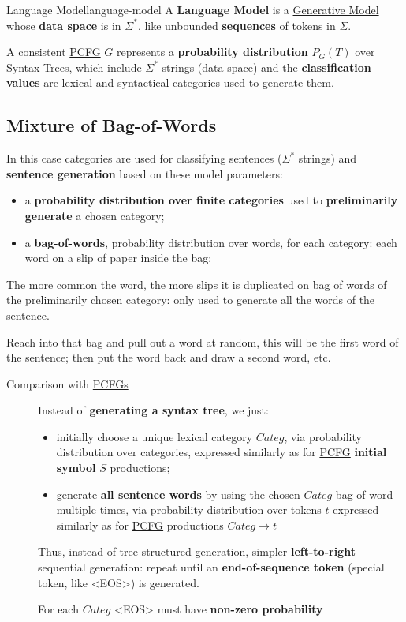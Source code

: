 \begin{definition}{Language Model}{language-model}
    A \textbf{Language Model} is a \hyperref[def:generative-model]{Generative Model} whose \textbf{data space} is in $\Sigma^*$, like unbounded \textbf{sequences} of tokens in $\Sigma$.
    \begin{example}{}{}
        A consistent \hyperref[def:pcfg]{PCFG} $G$ represents a \textbf{probability distribution} $P_G(T)$ over \hyperref[def:pg-syntax-tree]{Syntax Trees}, which include $\Sigma^*$ strings (data space) and the \textbf{classification values} are lexical and syntactical categories used to generate them.
    \end{example}
\end{definition}
%
\subsection{Mixture of Bag-of-Words}\label{sub:lm_mixture_of_bag_of_words} %
In this case categories are used for classifying sentences ($\Sigma^*$ strings) and \textbf{sentence generation} based on these model parameters:
\begin{itemize}
    \item a \textbf{probability distribution over finite categories} used to \textbf{preliminarily generate} a chosen category;
    \item a \textbf{bag-of-words}, probability distribution over words, for each category: each word on a slip of paper inside the bag;
\end{itemize}
The more common the word, the more slips it is duplicated on bag of words of the preliminarily chosen category: only used to generate all the words of the sentence.
\begin{note}
    Reach into that bag and pull out a word at random, this will be the first word of the sentence; then put the word back and draw a second word, etc.
\end{note}
\begin{description}
    \item[Comparison with {\hyperref[def:pcfg]{PCFGs}}] Instead of \textbf{generating a syntax tree}, we just:
        \begin{itemize}
            \item initially choose a unique lexical category $Categ$, via probability distribution over categories, expressed similarly as for \hyperref[def:pcfg]{PCFG} \textbf{initial symbol} $S$ productions;
            \item generate \textbf{all sentence words} by using the chosen $Categ$ bag-of-word multiple times, via probability distribution over tokens $t$ expressed similarly as for \hyperref[def:pcfg]{PCFG} productions $Categ\to t$
        \end{itemize}
        Thus, instead of tree-structured generation, simpler \textbf{left-to-right} sequential generation: repeat until an \textbf{end-of-sequence token} (special token, like <EOS>) is generated.
        \begin{warning}
            For each $Categ$ <EOS> must have \textbf{non-zero probability}
        \end{warning}
\end{description}
